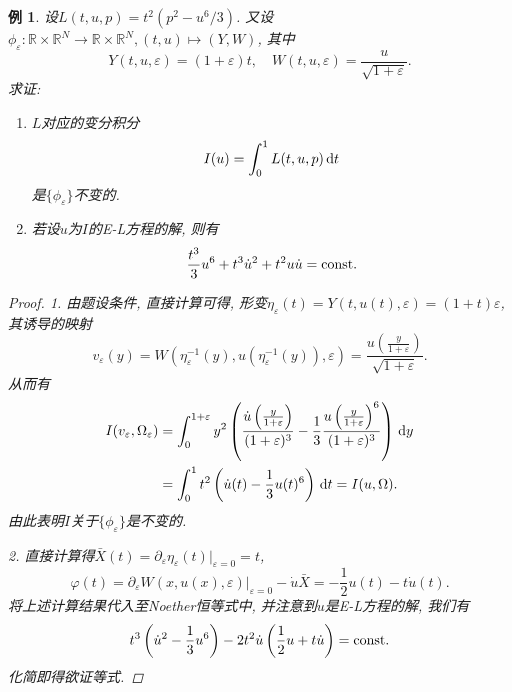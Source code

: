 \documentclass[12pt,a4paper]{article}
\newtheorem{example}[theorem]{例}
\begin{document}
\begin{example}
    设$L(t, u, p) = t^2(p^2 - u^6/3)$. 又设$\phi_{\varepsilon}\colon \mathbb{R} \times \mathbb{R}^N \rightarrow \mathbb{R} \times \mathbb{R}^N , (t, u) \mapsto(Y, W)$, 其中 
    \begin{equation*}
        Y(t, u, \varepsilon) = (1 + \varepsilon)t, \quad W(t, u, \varepsilon) = \frac{u}{\sqrt{1 + \varepsilon}}. 
    \end{equation*}
    求证:
    \begin{enumerate}
        \item $L$对应的变分积分 
        \begin{equation*}
            I(u) = \int_0^1L(t, u, p) \,{\rm d}t
        \end{equation*}
        是$\{\phi_{\varepsilon}\}$不变的.
        \item 若设$u$为$I$的E-L方程的解, 则有 
        \begin{equation*}
            \frac{t^3}{3}u^6 + t^3\dot u^2 + t^2u\dot u = {\rm const}.
        \end{equation*}
    \end{enumerate}
    \begin{proof}
        1. 由题设条件, 直接计算可得, 形变$\eta_{\varepsilon}(t) = Y(t, u(t), \varepsilon) = (1 + t)\varepsilon$, 其诱导的映射 
        \begin{equation*}
            v_{\varepsilon}(y) = W(\eta_{\varepsilon}^{-1}(y), u(\eta_{\varepsilon}^{-1}(y)), \varepsilon) = \frac{u\left(\frac{y}{1 + \varepsilon}\right)}{\sqrt{1 + \varepsilon}}.
        \end{equation*}
        从而有 
        \begin{align*}
            I(v_{\varepsilon}, \Omega_{\varepsilon}) &= \int_0^{1 + \varepsilon}y^2\left(\frac{\dot u\left(\frac{y}{1 + \varepsilon}\right)}{(1 + \varepsilon)^3} - \frac{1}{3}\frac{u\left(\frac{y}{1 + \varepsilon}\right)^6}{(1 + \varepsilon)^3}\right) \,{\rm d}y \\  
            &= \int_0^1t^2\left(\dot u(t) - \frac{1}{3}u(t)^6\right) \,{\rm d}t =I(u, \Omega).
        \end{align*}
        由此表明$I$关于$\{\phi_{\varepsilon}\}$是不变的.

        2. 直接计算得$\bar{X}(t) = \partial_{\varepsilon}\eta_{\varepsilon}(t)|_{\varepsilon = 0} = t$, 
        \begin{equation*}
            \varphi(t) = \partial_{\varepsilon}W(x, u(x), \varepsilon)|_{\varepsilon = 0} - \dot u \bar{X} = -\frac{1}{2}u(t) - t\dot u(t).
        \end{equation*}
        将上述计算结果代入至Noether恒等式中, 并注意到$u$是E-L方程的解, 我们有
        \begin{equation*}
            t^3\left(\dot u^2 - \frac{1}{3}u^6\right) - 2t^2\dot u\left(\frac{1}{2}u + t\dot u\right) = {\rm const}.
        \end{equation*} 
        化简即得欲证等式.
    \end{proof}
\end{example}
\end{document}

